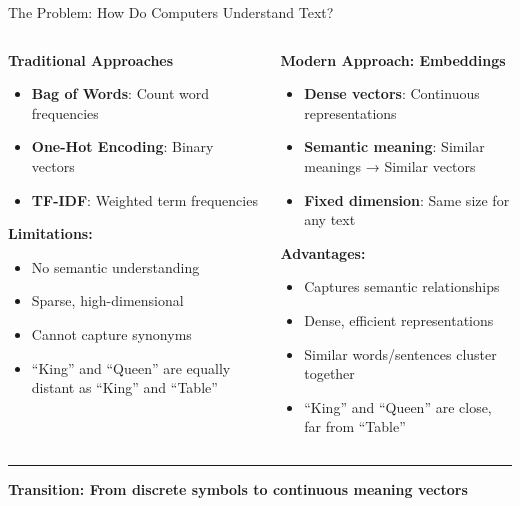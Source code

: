 \documentclass[8pt,aspectratio=169]{beamer}
\newcommand{\bottomnote}[1]{%
\vfill
\vspace{-2mm}
\textcolor{mllavender2}{\rule{\textwidth}{0.4pt}}
\vspace{1mm}
\footnotesize
\textbf{#1}
}
\begin{document}
\begin{frame}[t]{The Problem: How Do Computers Understand Text?}

\begin{columns}[t]
\begin{column}{0.48\textwidth}
\textbf{Traditional Approaches}
\begin{itemize}
    \item \textbf{Bag of Words}: Count word frequencies
    \item \textbf{One-Hot Encoding}: Binary vectors
    \item \textbf{TF-IDF}: Weighted term frequencies
\end{itemize}

\vspace{0.5cm}
\textbf{Limitations:}
\begin{itemize}
    \item No semantic understanding
    \item Sparse, high-dimensional
    \item Cannot capture synonyms
    \item ``King'' and ``Queen'' are equally distant as ``King'' and ``Table''
\end{itemize}
\end{column}

\begin{column}{0.48\textwidth}
\textbf{Modern Approach: Embeddings}
\begin{itemize}
    \item \textbf{Dense vectors}: Continuous representations
    \item \textbf{Semantic meaning}: Similar meanings → Similar vectors
    \item \textbf{Fixed dimension}: Same size for any text
\end{itemize}

\vspace{0.5cm}
\textbf{Advantages:}
\begin{itemize}
    \item Captures semantic relationships
    \item Dense, efficient representations
    \item Similar words/sentences cluster together
    \item ``King'' and ``Queen'' are close, far from ``Table''
\end{itemize}
\end{column}
\end{columns}

\bottomnote{Transition: From discrete symbols to continuous meaning vectors}
\end{frame}
\end{document}
